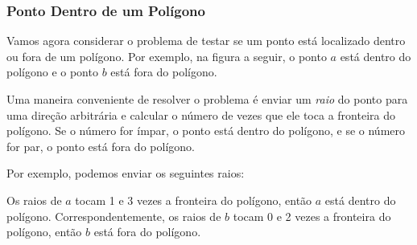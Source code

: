 \subsubsection{Ponto Dentro de um Polígono}

Vamos agora considerar o problema de
testar se um ponto está localizado dentro ou fora
de um polígono.
Por exemplo, na figura a seguir, o ponto $a$
está dentro do polígono e o ponto $b$ está fora
do polígono.

\begin{center}
\end{center}

Uma maneira conveniente de resolver o problema é
enviar um \emph{raio} do ponto para uma direção arbitrária
e calcular o número de vezes que ele toca
a fronteira do polígono.
Se o número for ímpar,
o ponto está dentro do polígono,
e se o número for par,
o ponto está fora do polígono.

\begin{samepage}
Por exemplo, podemos enviar os seguintes raios:
\begin{center}
\end{center}
\end{samepage}

Os raios de $a$ tocam 1 e 3 vezes
a fronteira do polígono,
então $a$ está dentro do polígono.
Correspondentemente, os raios de $b$
tocam 0 e 2 vezes a fronteira do polígono,
então $b$ está fora do polígono.


